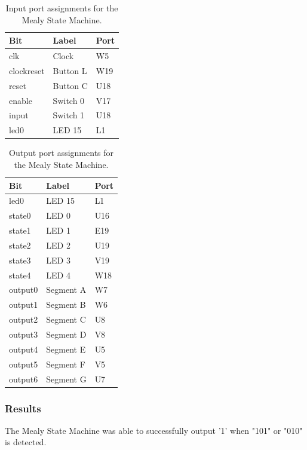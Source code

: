 \documentclass[11pt]{article}
\begin{document}
\begin{table}[H]
\begin{center}
\begin{tabular}{| l | l | l |}
	\hline
	Bit & Label & Port \\ \hline
	clk & Clock & W5 \\ \hline
	clockreset & Button L & W19 \\ \hline
	reset & Button C & U18 \\ \hline
	enable & Switch 0 & V17 \\ \hline
	input & Switch 1 & U18 \\ \hline
	led0 & LED 15 & L1 \\ \hline
\end{tabular}
\caption{\label{tab:mealy_input_ports}Input port assignments for the Mealy State Machine.}
\end{center}
\end{table}

\begin{table}[H]
\begin{center}
\begin{tabular}{| l | l | l |}
	\hline
	Bit & Label & Port \\ \hline
	led0 & LED 15 & L1 \\ \hline
	state0 & LED 0 & U16 \\ \hline
	state1 & LED 1 & E19 \\ \hline
 	state2 & LED 2 & U19 \\ \hline
	state3 & LED 3 & V19 \\ \hline
	state4 & LED 4 & W18 \\ \hline
	output0 & Segment A & W7 \\ \hline
	output1 & Segment B & W6 \\ \hline
	output2 & Segment C & U8 \\ \hline
	output3 & Segment D & V8 \\ \hline
	output4 & Segment E & U5 \\ \hline
	output5 & Segment F & V5 \\ \hline
	output6 & Segment G & U7 \\ \hline
\end{tabular}
\caption{\label{tab:mealy_output_ports}Output port assignments for the Mealy State Machine.}
\end{center}
\end{table}

\subsubsection{Results}
The Mealy State Machine was able to successfully output '1' when "101" or "010" is detected.
\end{document}

